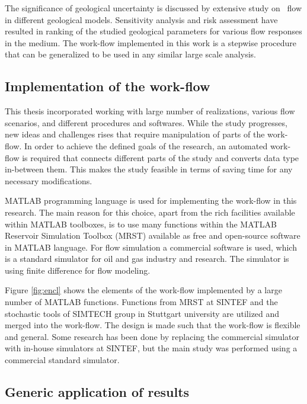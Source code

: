 The significance of geological uncertainty is discussed by extensive study on \coo\ flow in different geological models. Sensitivity analysis and risk assessment have resulted in ranking of the studied geological parameters for various flow responses in the medium. The work-flow implemented in this work is a stepwise procedure that can be generalized to be used in any similar large scale analysis.

\subsection{Implementation of the work-flow}
\label{sec:implementationWorkflow}
This thesis incorporated working with large number of realizations, various flow
scenarios, and different procedures and softwares. While the study progresses,
new ideas and challenges rises that require manipulation of parts of the
work-flow. In order to achieve the defined goals of the research, an automated
work-flow is required that connects different parts of the study and converts
data type in-between them. This makes the study feasible in terms of saving time
for any necessary modifications.

MATLAB programming language is used for implementing the work-flow in this
research. The main reason for this choice, apart from the rich facilities
available within MATLAB toolboxes, is to use many functions within the 
MATLAB Reservoir Simulation Toolbox (MRST) \cite{lie2011open,mrst} available as
free and
open-source software in MATLAB language. For flow simulation a commercial
software is used, which is a standard simulator for oil and gas industry and
research. The simulator is using finite difference for flow modeling. 

Figure \ref{fig:encl} shows the elements of the work-flow implemented by a large
number of MATLAB functions. Functions from MRST at SINTEF and the stochastic
tools of SIMTECH group in Stuttgart university are utilized and merged into the
work-flow. The design is made such that the work-flow is flexible and general.
Some research has been done by replacing the commercial simulator with in-house
simulators at SINTEF, but the main study was performed using a commercial standard simulator. 

\subsection{Generic application of results}
\label{genericApply}

